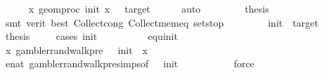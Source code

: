\begin{isabellebody}
\ \ \ \ \isamarkupfalse%
\ {\isacartoucheopen}{\isasymAnd}x{\isachardot}{\kern0pt}\ geom{\isacharunderscore}{\kern0pt}proc\ init\ x\ {}\ {\isacharequal}{\kern0pt}\ target{\isacartoucheclose}\isanewline
\ \ \ \ \isamarkupfalse%
\ auto\ \isanewline
\ \ \ \ \isamarkupfalse%
\ \isamarkupfalse%
\ {\isacharquery}{\kern0pt}thesis\isanewline
\ \ \ \ \ \ \isamarkupfalse%
\ {\isacharparenleft}{\kern0pt}smt\ {\isacharparenleft}{\kern0pt}verit{\isacharcomma}{\kern0pt}\ best{\isacharparenright}{\kern0pt}\ Collect{\isacharunderscore}{\kern0pt}cong\ Collect{\isacharunderscore}{\kern0pt}mem{\isacharunderscore}{\kern0pt}eq\ sets{\isachardot}{\kern0pt}top{\isacharparenright}{\kern0pt}\isanewline
\ \ \isamarkupfalse%
\isanewline
\ \ \ \ \isamarkupfalse%
\ {\isachardoublequoteopen}init\ {\isasymnoteq}\ target{\isachardoublequoteclose}\isanewline
\ \ \ \ \isamarkupfalse%
\ {\isacharquery}{\kern0pt}thesis\isanewline
\ \ \ \ \isamarkupfalse%
{\isacharparenleft}{\kern0pt}cases\ {\isachardoublequoteopen}init\ {\isacharequal}{\kern0pt}\ {}{\isachardoublequoteclose}{\isacharparenright}{\kern0pt}\isanewline
\ \ \ \ \ \ \isamarkupfalse%
\ equ{}{\isacharcolon}{\kern0pt}{\isachardoublequoteopen}init\ {\isacharequal}{\kern0pt}\ {}{\isachardoublequoteclose}\isanewline
\ \ \ \ \ \ \isamarkupfalse%
\ \isamarkupfalse%
\ {\isachardoublequoteopen}{\isasymAnd}x{\isachardot}{\kern0pt}\ gambler{\isacharunderscore}{\kern0pt}rand{\isacharunderscore}{\kern0pt}walk{\isacharunderscore}{\kern0pt}pre\ {}\ {\isacharparenleft}{\kern0pt}{\isacharminus}{\kern0pt}{}{\isacharparenright}{\kern0pt}\ init\ {}\ x\ {\isacharequal}{\kern0pt}\ {}{\isachardoublequoteclose}\isanewline
\ \ \ \ \ \ \ \ \isamarkupfalse%
\ enat{\isacharunderscore}{\kern0pt}{}\ gambler{\isacharunderscore}{\kern0pt}rand{\isacharunderscore}{\kern0pt}walk{\isacharunderscore}{\kern0pt}pre{\isachardot}{\kern0pt}simps{\isacharparenleft}{\kern0pt}{}{\isacharparenright}{\kern0pt}{\isacharbrackleft}{\kern0pt}of\ {}\ {\isachardoublequoteopen}{\isacharminus}{\kern0pt}{}{\isachardoublequoteclose}\ init\ {\isacharunderscore}{\kern0pt}{\isacharbrackright}{\kern0pt}\isanewline
\ \ \ \ \ \ \ \ \isamarkupfalse%
\ force\isanewline
\ \ \ \ \ \ \isamarkupfalse%
\ \isamarkupfalse%

\end{isabellebody}
